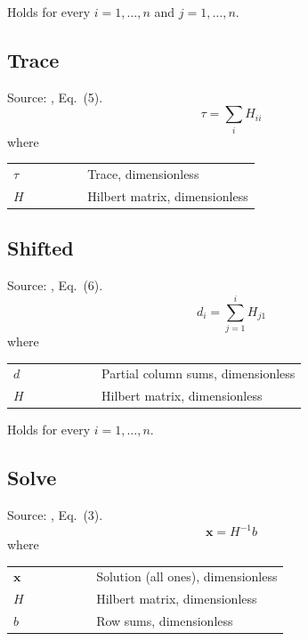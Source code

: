 \noindent Holds for every $i = 1, \dots, n$ and $j = 1, \dots, n$.

\subsection{Trace}
Source: \cite{ref}, Eq.~(5).
\begin{equation}
  \tau = \sum_i H_{ii}
  \label{eq:trace}
\end{equation}
\noindent where

\noindent\begin{tabular}{@{\quad}l@{\quad}p{0.7\linewidth}@{}}
  $\tau$ & Trace, dimensionless \\
  $H$ & Hilbert matrix, dimensionless \\
\end{tabular}


\subsection{Shifted}
Source: \cite{ref}, Eq.~(6).
\begin{equation}
  d_i = \sum_{j=1}^{i} H_{j1}
  \label{eq:shifted}
\end{equation}
\noindent where

\noindent\begin{tabular}{@{\quad}l@{\quad}p{0.7\linewidth}@{}}
  $d$ & Partial column sums, dimensionless \\
  $H$ & Hilbert matrix, dimensionless \\
\end{tabular}

\noindent Holds for every $i = 1, \dots, n$.

\subsection{Solve}
Source: \cite{ref}, Eq.~(3).
\begin{equation}
  \mathbf{x} = H^{-1} b
  \label{eq:solve}
\end{equation}
\noindent where

\noindent\begin{tabular}{@{\quad}l@{\quad}p{0.7\linewidth}@{}}
  $\mathbf{x}$ & Solution (all ones), dimensionless \\
  $H$ & Hilbert matrix, dimensionless \\
  $b$ & Row sums, dimensionless \\
\end{tabular}


